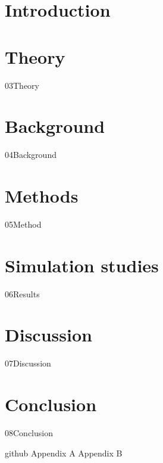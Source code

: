\documentclass[a4paper, 12pt, openany]{book} %
\begin{document}

\setlength{\parindent}{0pt}     %
\setlength{\parskip}{1em}       %

\chapter{Introduction}

\cleardoublepage




\mainmatter

\chapter{Theory}
{03Theory}
\cleardoublepage

\chapter{Background}
{04Background}
\cleardoublepage

\chapter{Methods}
{05Method}
\cleardoublepage

\chapter{Simulation studies}
{06Results}
\cleardoublepage

\chapter{Discussion}
{07Discussion}
\cleardoublepage

\chapter{Conclusion}
{08Conclusion}
\cleardoublepage

\newpage
\printbibliography[heading = bibintoc, title = Bibliography]    %
\cleardoublepage

\addappendix
{github}
{Appendix A}
{Appendix B}

\end{document}
